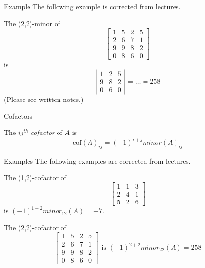 \documentclass{beamer}
\begin{document}
\begin{frame}{Example}
  \alert{The following example is corrected from lectures.}
  \begin{example}
    The (2,2)-minor of
    \begin{equation*}
      \left[
	\begin{array}{cccc}
          1&5&2&5\\
          2&6&7&1\\
          9&9&8&2\\
          0&8&6&0
	\end{array}
      \right]
    \end{equation*}
    is
    \begin{equation*}
      \left|
	\begin{array}{cccc}
          1&2&5\\
          9&8&2\\
          0&6&0
	\end{array}
      \right| = \dots = 258
    \end{equation*}
    (Please see written notes.)
  \end{example}
\end{frame}

\begin{frame}{Cofactors}
  \begin{definition}
    The \emph{$ij^{th}$ cofactor} of $A$ is
    \begin{equation*}
      \mbox{cof}(A)_{ij}=(-1)^{i+j} minor \left(A\right)_{ij}
    \end{equation*}
  \end{definition}
\end{frame}

\begin{frame}{Examples}
  \alert{The following examples are corrected from lectures.}
  \begin{example}
    The (1,2)-cofactor of
    \begin{equation*}
      \left[
	\begin{array}{ccc}
          1&1&3\\
          2&4&1\\
          5&2&6
	\end{array}
      \right]
    \end{equation*}
    is $(-1)^{1+2}minor_{12}(A) = -7$.
  \end{example}
  \begin{example}
    The (2,2)-cofactor of
    \begin{equation*}
      \left[
	\begin{array}{cccc}
          1&5&2&5\\
          2&6&7&1\\
          9&9&8&2\\
          0&8&6&0
	\end{array}
      \right] \text{ is } (-1)^{2+2}minor_{22}(A) = 258
    \end{equation*}
  \end{example}
\end{frame}
\end{document}
